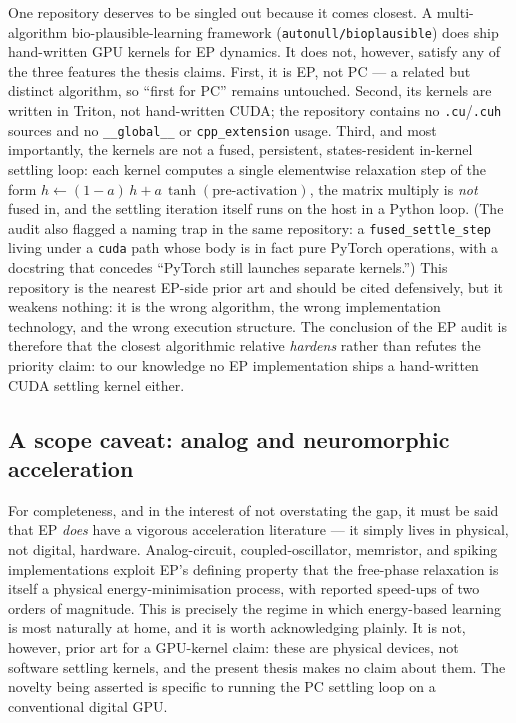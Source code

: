 One repository deserves to be singled out because it comes closest. A multi-algorithm
bio-plausible-learning framework (\texttt{autonull/bioplausible}) does ship hand-written GPU
kernels for EP dynamics. It does not, however, satisfy any of the three features the thesis
claims. First, it is EP, not PC --- a related but distinct algorithm, so ``first for PC''
remains untouched. Second, its kernels are written in Triton, not hand-written CUDA; the
repository contains no \texttt{.cu}/\texttt{.cuh} sources and no \texttt{\_\_global\_\_} or
\texttt{cpp\_extension} usage. Third, and most importantly, the kernels are not a fused,
persistent, states-resident in-kernel settling loop: each kernel computes a single
elementwise relaxation step of the form $h \leftarrow (1-a)\,h + a\,\tanh(\text{pre-activation})$,
the matrix multiply is \emph{not} fused in, and the settling iteration itself runs on the
host in a Python loop. (The audit also flagged a naming trap in the same repository: a
\texttt{fused\_settle\_step} living under a \texttt{cuda} path whose body is in fact pure
PyTorch operations, with a docstring that concedes ``PyTorch still launches separate
kernels.'') This repository is the nearest EP-side prior art and should be cited
defensively, but it weakens nothing: it is the wrong algorithm, the wrong implementation
technology, and the wrong execution structure. The conclusion of the EP audit is therefore
that the closest algorithmic relative \emph{hardens} rather than refutes the priority claim:
to our knowledge no EP implementation ships a hand-written CUDA settling kernel either.

\subsection{A scope caveat: analog and neuromorphic acceleration}

For completeness, and in the interest of not overstating the gap, it must be said that EP
\emph{does} have a vigorous acceleration literature --- it simply lives in physical, not
digital, hardware. Analog-circuit, coupled-oscillator, memristor, and spiking
implementations exploit EP's defining property that the free-phase relaxation is itself a
physical energy-minimisation process, with reported speed-ups of two orders of magnitude.
This is precisely the regime in which energy-based learning is most naturally at home, and
it is worth acknowledging plainly. It is not, however, prior art for a GPU-kernel claim:
these are physical devices, not software settling kernels, and the present thesis makes no
claim about them. The novelty being asserted is specific to running the PC settling loop on
a conventional digital GPU.


